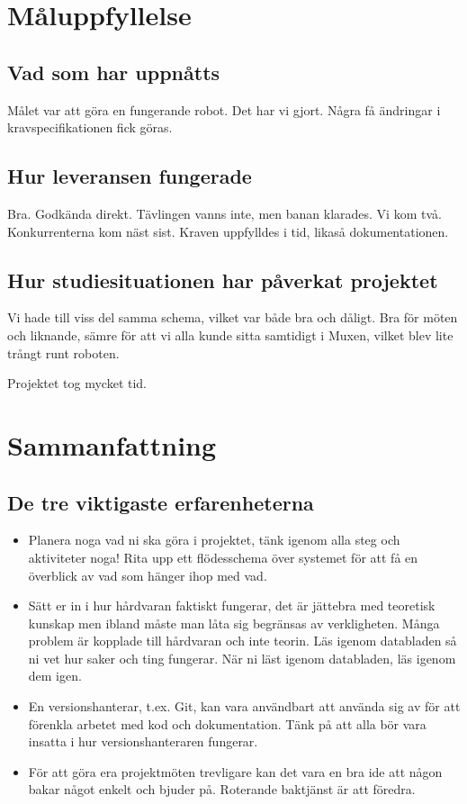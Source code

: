 \documentclass[a4paper,12pt]{article}
\begin{document}
\section{Måluppfyllelse}
\subsection{Vad som har uppnåtts}
Målet var att göra en fungerande robot. Det har vi gjort. Några få ändringar i kravspecifikationen fick göras. 

\subsection{Hur leveransen fungerade}
Bra. Godkända direkt. Tävlingen vanns inte, men banan klarades. Vi kom två. Konkurrenterna kom näst sist. Kraven 
uppfylldes i tid, likaså dokumentationen.  

\subsection{Hur studiesituationen har påverkat projektet}
Vi hade till viss del samma schema, vilket var både bra och dåligt. Bra för möten och liknande, sämre för att vi alla 
kunde sitta samtidigt i Muxen, vilket blev lite trångt runt roboten. 

Projektet tog mycket tid. 

\section{Sammanfattning}
\subsection{De tre viktigaste erfarenheterna}
\begin{itemize}
\item Planera noga vad ni ska göra i projektet, tänk igenom alla steg och
aktiviteter noga! Rita upp ett flödesschema över systemet för att få en
överblick av vad som hänger ihop med vad.
\item Sätt er in i hur hårdvaran faktiskt fungerar, det är jättebra med
teoretisk kunskap men ibland måste man låta sig begränsas av verkligheten.
Många problem är kopplade till hårdvaran och inte teorin. Läs igenom databladen
så ni vet hur saker och ting fungerar. När ni läst igenom databladen, läs igenom
dem igen. 
\item En versionshanterar, t.ex. Git, kan vara användbart att använda sig av för
att förenkla arbetet med kod och dokumentation. Tänk på att alla bör vara
insatta i hur versionshanteraren fungerar. 
\item För att göra era projektmöten trevligare kan det vara en bra ide att någon
bakar något enkelt och bjuder på. Roterande baktjänst är att föredra.
\end{itemize}
\end{document}
